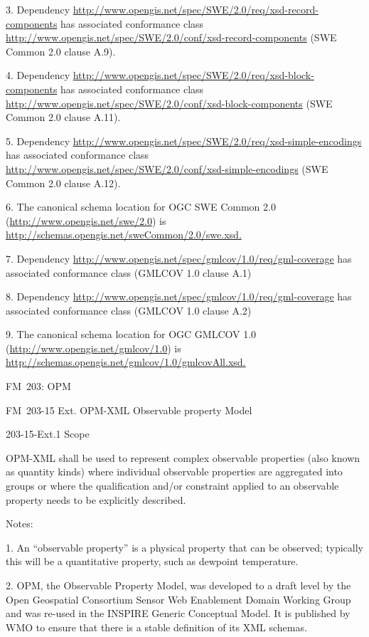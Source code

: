 3. Dependency \url{http://www.opengis.net/spec/SWE/2.0/req/xsd-record-components} has associated conformance class \url{http://www.opengis.net/spec/SWE/2.0/conf/xsd-record-components} (SWE Common 2.0 clause A.9).

4. Dependency \url{http://www.opengis.net/spec/SWE/2.0/req/xsd-block-components} has associated conformance class \url{http://www.opengis.net/spec/SWE/2.0/conf/xsd-block-components} (SWE Common 2.0 clause A.11).

5. Dependency \url{http://www.opengis.net/spec/SWE/2.0/req/xsd-simple-encodings} has associated conformance class \url{http://www.opengis.net/spec/SWE/2.0/conf/xsd-simple-encodings} (SWE Common 2.0 clause A.12).

6. The canonical schema location for OGC SWE Common 2.0 (\url{http://www.opengis.net/swe/2.0}) is \href{http://schemas.opengis.net/sweCommon/2.0/swe.xsd}{http://schemas.opengis.net/sweCommon/2.0/swe.xsd.}

7. Dependency \url{http://www.opengis.net/spec/gmlcov/1.0/req/gml-coverage} has associated conformance class (GMLCOV 1.0 clause A.1)

8. Dependency \url{http://www.opengis.net/spec/gmlcov/1.0/req/gml-coverage} has associated conformance class (GMLCOV 1.0 clause A.2)

9. The canonical schema location for OGC GMLCOV 1.0 (\url{http://www.opengis.net/gmlcov/1.0}) is \href{http://schemas.opengis.net/gmlcov/1.0/gmlcovAll.xsd}{http://schemas.opengis.net/gmlcov/1.0/gmlcovAll.xsd.}

FM~203: OPM

FM~203-15 Ext. OPM-XML Observable property Model

203-15-Ext.1 Scope

OPM-XML shall be used to represent complex observable properties (also known as quantity kinds) where individual observable properties are aggregated into groups or where the qualification and/or constraint applied to an observable property needs to be explicitly described.

Notes:

1. An ``observable property'' is a physical property that can be observed; typically this will be a quantitative property, such as dewpoint temperature.

2. OPM, the Observable Property Model, was developed to a draft level by the Open Geospatial Consortium Sensor Web Enablement Domain Working Group and was re-used in the INSPIRE Generic Conceptual Model. It is published by WMO to ensure that there is a stable definition of its XML schemas.

